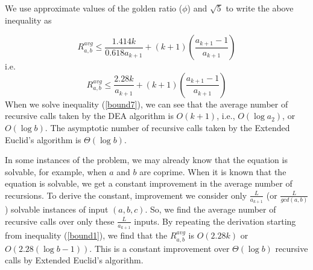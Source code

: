 \documentclass[pdflatex,sn-mathphys-num]{sn-jnl}%
\theoremstyle{thmstyleone}%
\theoremstyle{thmstyletwo}%
\theoremstyle{thmstylethree}%
\begin{document}
We use approximate values of the golden ratio ($\phi$) and $\sqrt{5}$ to write the above inequality as

$$
    R_{a,b}^{avg}\le  \frac{1.414k}{{0.618}a_{k+1}}+(k+1)\left(\frac{a_{k+1}-1}{a_{k+1}}\right) 
$$
i.e.
\begin{equation}\label{bound7}
     R_{a,b}^{avg}\le  \frac{2.28k}{a_{k+1}}+(k+1)\left(\frac{a_{k+1}-1}{a_{k+1}}\right) 
\end{equation}
 When we solve inequality (\ref{bound7}), we can see that the average number of recursive calls taken by the DEA algorithm is $O(k+1)$, i.e., $O(\log a_2)$, or $O(\log b)$. The asymptotic number of recursive calls taken by the Extended Euclid's algorithm is $\Theta(\log b)$. 
 \par In some instances of the problem, we may already know that the equation is solvable, for example, when $a$ and $b$ are coprime. When it is known that the equation is solvable, we get a constant improvement in the average number of recursions. To derive the constant, improvement we consider only $\frac{L}{a_{k+1}}$ (or $\frac{L}{gcd(a,b)}$) solvable instances of input $(a,b,c)$. So, we find the average number of recursive calls over only these $\frac{L}{a_{k+1}}$ inputs. By repeating the derivation starting from inequality (\ref{bound1}), we find that the $R_{a,b}^{avg}$ is $O(2.28k)$ or $O(2.28 (\log b - 1))$. This is a constant improvement over $\Theta(\log b)$ recursive calls by Extended Euclid's algorithm. 
 
\end{document}
